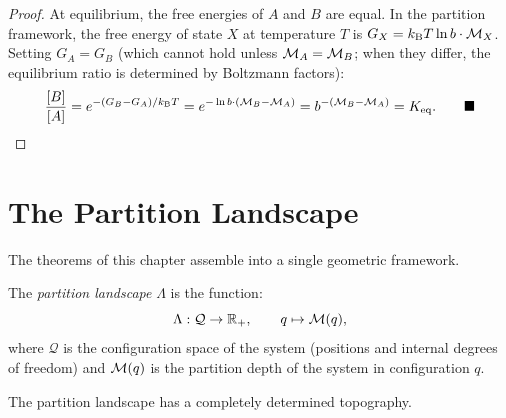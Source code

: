 \begin{proof}
At equilibrium, the free energies of $A$ and $B$ are equal. In the partition
framework, the free energy of state $X$ at temperature $T$ is
$G_X = k_{\mathrm{B}} T \ln b \cdot \mathcal{M}_X$. Setting $G_A = G_B$ (which cannot hold
unless $\mathcal{M}_A = \mathcal{M}_B$; when they differ, the equilibrium ratio is
determined by Boltzmann factors):
\begin{equation}
  \frac{[B]}{[A]} = e^{-(G_B - G_A)/k_{\mathrm{B}} T} = e^{-\ln b \cdot (\mathcal{M}_B - \mathcal{M}_A)}
                  = b^{-(\mathcal{M}_B - \mathcal{M}_A)} = K_{\mathrm{eq}}. \qquad\blacksquare
\end{equation}
\end{proof}

\section{The Partition Landscape}
\label{sec:partition_landscape}

The theorems of this chapter assemble into a single geometric framework.

\begin{definition}
\label{def:partition_landscape}
The \emph{partition landscape} $\Lambda$ is the function:
\begin{equation}
  \Lambda: \mathcal{Q} \to \mathbb{R}_+, \qquad q \mapsto \mathcal{M}(q),
  \label{eq:partition_landscape}
\end{equation}
where $\mathcal{Q}$ is the configuration space of the system (positions and
internal degrees of freedom) and $\mathcal{M}(q)$ is the partition depth of the
system in configuration $q$.
\end{definition}

The partition landscape has a completely determined topography.

